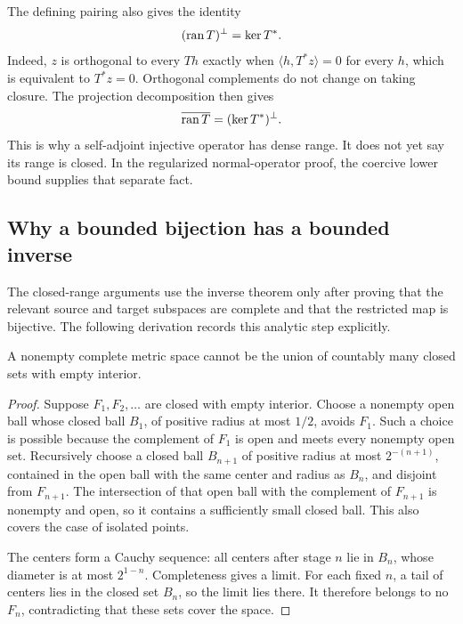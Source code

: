 The defining pairing also gives the identity
\begin{equation}\label{eq:adjoint-range-orthogonal}
 (\operatorname{ran} T)^\perp=\ker T^*.
\end{equation}
Indeed, \(z\) is orthogonal to every \(Th\) exactly when \(\langle h,T^*z\rangle=0\) for every \(h\), which is equivalent to \(T^*z=0\). Orthogonal complements do not change on taking closure. The projection decomposition then gives
\[
 \overline{\operatorname{ran} T}=(\ker T^*)^\perp.
\]
This is why a self-adjoint injective operator has dense range. It does not yet say its range is closed. In the regularized normal-operator proof, the coercive lower bound supplies that separate fact.

\subsection{Why a bounded bijection has a bounded inverse}
The closed-range arguments use the inverse theorem only after proving that the relevant source and target subspaces are complete and that the restricted map is bijective. The following derivation records this analytic step explicitly.

\begin{lemma}\label{lem:baire-tool}
A nonempty complete metric space cannot be the union of countably many closed sets with empty interior.
\end{lemma}
\begin{proof}
Suppose \(F_1,F_2,\ldots\) are closed with empty interior. Choose a nonempty open ball whose closed ball \(B_1\), of positive radius at most \(1/2\), avoids \(F_1\). Such a choice is possible because the complement of \(F_1\) is open and meets every nonempty open set. Recursively choose a closed ball \(B_{n+1}\) of positive radius at most \(2^{-(n+1)}\), contained in the open ball with the same center and radius as \(B_n\), and disjoint from \(F_{n+1}\). The intersection of that open ball with the complement of \(F_{n+1}\) is nonempty and open, so it contains a sufficiently small closed ball. This also covers the case of isolated points.

The centers form a Cauchy sequence: all centers after stage \(n\) lie in \(B_n\), whose diameter is at most \(2^{1-n}\). Completeness gives a limit. For each fixed \(n\), a tail of centers lies in the closed set \(B_n\), so the limit lies there. It therefore belongs to no \(F_n\), contradicting that these sets cover the space.
\end{proof}

